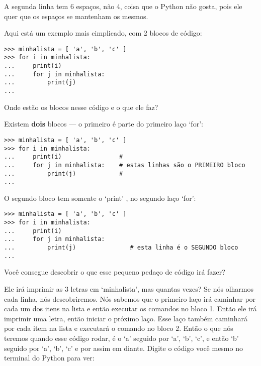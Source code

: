 A segunda linha tem 6 espaços, não 4, coisa que o Python não gosta, pois ele quer que os espaços se mantenham os mesmos.


\par
Aqui está um exemplo mais cimplicado, com 2 blocos de código:

\begin{listing}
\begin{verbatim}
>>> minhalista = [ 'a', 'b', 'c' ]
>>> for i in minhalista:
...     print(i)
...     for j in minhalista:
...         print(j)
...
\end{verbatim}
\end{listing}

\noindent
Onde estão os blocos nesse código e o que ele faz?
\par
\noindent
Existem \textbf{dois} blocos --- o primeiro é parte do primeiro laço `for':

\begin{listing}
\begin{verbatim}
>>> minhalista = [ 'a', 'b', 'c' ]
>>> for i in minhalista:
...     print(i)                #
...     for j in minhalista:    # estas linhas são o PRIMEIRO bloco
...         print(j)            #
...
\end{verbatim}
\end{listing}

O segundo bloco tem somente o `print' , no segundo laço `for':

\begin{listing}
\begin{verbatim}
>>> minhalista = [ 'a', 'b', 'c' ]
>>> for i in minhalista:
...     print(i)
...     for j in minhalista:
...         print(j)               # esta linha é o SEGUNDO bloco
...
\end{verbatim}
\end{listing}

Você consegue descobrir o que esse pequeno pedaço de código irá fazer?
\par
Ele irá imprimir as 3 letras em `minhalista', mas quantas vezes? Se nós olharmos cada linha, nós descobriremos. Nós sabemos que o primeiro laço irá caminhar por cada um dos itens na lista e então executar os comandos no bloco 1. Então ele irá imprimir uma letra, então iniciar o próximo laço. Esse laço também caminhará por cada item na lista e executará o comando no bloco 2. Então o que nós teremos quando esse código rodar, é o `a' seguido por `a', `b', `c', e então `b' seguido por `a', `b', `c' e por assim em diante. Digite o código você mesmo no terminal do Python para ver:

